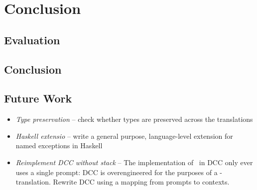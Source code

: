 \chapter{Conclusion}

\section{Evaluation}
\section{Conclusion}

\section{Future Work}
\begin{itemize}
  \item \emph{Type preservation} -- check whether types are preserved across the translations
  \item \emph{Haskell extensio} -- write a general purpose, language-level extension for named exceptions in Haskell
  \item \emph{Reimplement DCC without stack} -- The implementation of \lmu\ in DCC only ever uses a single prompt: DCC is overengineered for the purposes of a \lmu-translation. Rewrite DCC using a mapping from prompts to contexts.
\end{itemize}
